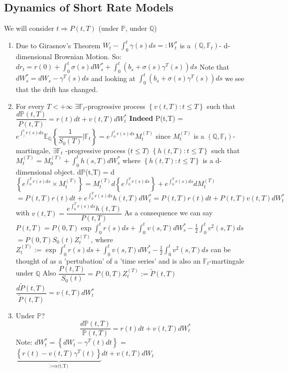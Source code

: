 \documentclass[10pt, oneside, reqno]{amsbook}
\theoremstyle{plain}%
\theoremstyle{definition}
\theoremstyle{rem}
\theoremstyle{definition}
\def\Pbb{\ensuremath{\mathbb{P}}}
\def\Qbb{\ensuremath{\mathbb{Q}}}
\newcommand{\lt}{<}
\newcommand{\F}{\mathbb{F}}
\numberwithin{equation}{chapter}
\begin{document}
\subsection{Dynamics of Short Rate Models}
We will consider $t \Rightarrow P(t,T)$ (under \Pbb, under \Qbb)
\begin{enumerate}
 \item Due to Girasnov's Theorem $W_t - \int_0^t \gamma(s) ds =: W_t^{*}$ is a 
$(\Qbb, \F_t)$- d-dimensional Brownian Motion. So: $dr_t = r(0) + \int_0^t \sigma(s) dW^{*}_s + 
\int_0^t (b_s + \sigma(s) \gamma^{T} (s)) ds$
\newline Note that $dW^{*}_s = dW_s - \gamma^{T}(s)ds$ and looking at 
$\int_0^t (b_s + \sigma(s) \gamma^{T} (s)) ds$ we see that the drift has changed.
\item For every $T \lt +\infty$ $\exists \F_t$-progressive process $\left\lbrace v(t,T): t \leq T \right\rbrace$ 
such that $\dfrac{d \Pbb(t,T)}{P(t,T)} = r(t)dt + v(t,T) dW^*_t$
\newline 
\textbf{Indeed} P(t,T) = $e^{\int_{)}^{t}r(s)ds} \mathbb{E}_{\Qbb}\left\lbrace \dfrac{1}{S_{0}(T)}| \F_t
\right\rbrace = e^{\int_{0}^{t}r(s)ds}M_t^{(T)}$ since $M_t^{(T)}$ is a $(\Qbb, \F_t)$-martingale, $\exists \F_t$
-progressive process ($t \leq T)$ $\left\lbrace h(t,T): t \leq T\right\rbrace$ such that $M_t^{(T)} = M_0^{(T)} +
\int_{0}^{t} h(s,T)dW^*_s $
where $\left\lbrace h(t,T): t \leq T\right\rbrace$ is  a d-dimensional object.
\newline 
d\Pbb(t,T) = d $\left\lbrace e^{\int_{0}^{T}r(s)ds} \times M^{(T)}_t\right\rbrace = M^{(T)}_t d\left\lbrace
e^{\int_{0}^{T}r(s)ds} \right\rbrace + e^{\int_{0}^{T}r(s)ds} dM^{(T)}_{t}$
\begin{displaymath} =P(t,T) r(t)dt + e^{\int_{0}^{T}r(s)ds}
h(t,T) dW^*_t = P(t,T)r(t) dt + P(t,T) v(t,T) dW^*_{t} \end{displaymath}
with $v(t,T) = \dfrac{e^{\int_{0}^{T}r(s)ds}h(t,T)}{P(t,T)}$
\newline As a consequence we can say 
$P(t,T) = P(0,T)\exp{\int_0^t r(s) ds + \int_0^t v(s,T)dW^*_s - \frac{1}{2} \int_0^t v^{2} (s,T) ds}$
$= P(0,T) S_{0}(t) Z_{t}^{(T)}$, where 
$Z_{t}^{(T)}:=\exp{\int_0^t r(s) ds + \int_0^t v(s,T)dW^*_s - 
\frac{1}{2} \int_0^t v^{2} (s,T) ds}$ can be thought of as a 'pertubation' of a 'time series' 
and is also an $\F_t$-martingale under \Qbb
Also $\dfrac{P(t,T)}{S_{0}(t)} = P(0,T)Z_{t}^{(T)} := \tilde{P}(t,T)$
$\dfrac{d\tilde{P}(t,T)}{\tilde{P}(t,T)} = v(t,T) dW_t^{*}$
\item Under \Pbb? 
\begin{equation}
 \dfrac{d \Pbb(t,T)}{\Pbb(t,T)} = r(t)dt + v(t,T) dW_t^{*} 
\end{equation}
Note: $dW_t^{*} = \left\lbrace dW_t - \gamma^{T} (t) dt\right\rbrace$
= $\underbrace{\left\lbrace r(t) - v(t,T) \gamma^{T}(t) \right\rbrace}_{\text{:=$\alpha$(t,T)}} dt + v(t,T)dW_{t}$
\end{enumerate}
\end{document}
